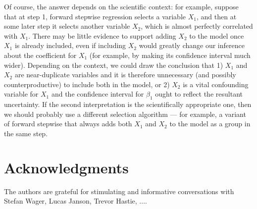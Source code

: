 \documentclass{article}
\begin{document}
Of course, the answer depends on the scientific context: for example, suppose that at step 1, forward stepwise regression selects a variable $X_1$, and then at some later step it selects another variable $X_2$, which is almost perfectly correlated with $X_1$. There may be little evidence to support adding $X_2$ to the model once $X_1$ is already included, even if including $X_2$ would greatly change our inference about the coefficient for $X_1$ (for example, by making its confidence interval much wider). Depending on the context, we could draw the conclusion that 1) $X_1$ and $X_2$ are near-duplicate variables and it is therefore unnecessary (and possibly counterproductive) to include both in the model, or 2) $X_2$ is a vital confounding variable for $X_1$ and the confidence interval for $\beta_1$ ought to reflect the resultant uncertainty. If the second interpretation is the scientifically appropriate one, then we should probably use a different selection algorithm --- for example, a variant of forward stepwise that always adds both $X_1$ and $X_2$ to the model as a group in the same step.



\section*{Acknowledgments}

The authors are grateful for stimulating and informative conversations with Stefan Wager, Lucas Janson, Trevor Hastie, ....



\end{document}
